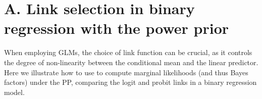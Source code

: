\address{Luiz M. Carvalho\\
  Getulio Vargas Foundation\\
  Rio de Janeiro \\
  Brazil\\
  University of North Carolina at Chapel Hill\\
  135 Dauer Drive, Chapel Hill, NC\\
  USA\\
  }

\address{Joseph G. Ibrahim\\
  University of North Carolina at Chapel Hill\\
  135 Dauer Drive, Chapel Hill, NC\\
  USA\\
  }

\newpage

\appendix

\setcounter{figure}{0}
\setcounter{table}{0}
\renewcommand{\thetable}{S\arabic{table}}
\renewcommand{\thefigure}{S\arabic{figure}}

\section*{ A. Link selection in binary regression with the power prior}
\label{sec:app_link_selection}

When employing GLMs, the choice of link function can be crucial, as it controls the degree of non-linearity between the conditional mean and the linear predictor. Here we illustrate how to use  to compute marginal likelihoods (and thus Bayes factors) under the PP, comparing the logit and probit links in a binary regression model.

